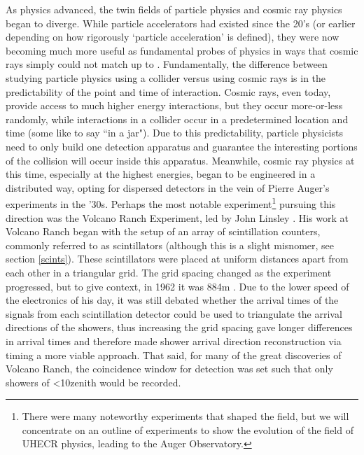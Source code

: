 As physics advanced, the twin fields of particle physics and cosmic ray physics began to diverge. While particle accelerators had existed since the 20's (or earlier depending on how rigorously `particle acceleration' is defined), they were now becoming much more useful as fundamental probes of physics in ways that cosmic rays simply could not match up to \cite{colliderhistory1}. Fundamentally, the difference between studying particle physics using a collider versus using cosmic rays is in the predictability of the point and time of interaction. Cosmic rays, even today, provide access to much higher energy interactions, but they occur more-or-less randomly, while interactions in a collider occur in a predetermined location and time (some like to say ``in a jar"). Due to this predictability, particle physicists need to only build one detection apparatus and guarantee the interesting portions of the collision will occur inside this apparatus. Meanwhile, cosmic ray physics at this time, especially at the highest energies, began to be engineered in a distributed way, opting for dispersed detectors in the vein of Pierre Auger's experiments in the '30s. 
Perhaps the most notable experiment\footnote{There were many noteworthy experiments that shaped the field, but we will concentrate on an outline of experiments to show the evolution of the field of UHECR physics, leading to the Auger Observatory.} pursuing this direction was the Volcano Ranch Experiment, led by John Linsley \cite{linsley}. His work at Volcano Ranch began with the setup of an array of scintillation counters, commonly referred to as scintillators (although this is a slight misnomer, see section \ref{scints}). These scintillators were placed at uniform distances apart from each other in a triangular grid. The grid spacing changed as the experiment progressed, but to give context, in 1962 it was 884m \cite{volranch}. Due to the lower speed of the electronics of his day, it was still debated whether the arrival times of the signals from each scintillation detector could be used to triangulate the arrival directions of the showers, thus increasing the grid spacing gave longer differences in arrival times and therefore made shower arrival direction reconstruction via timing a more viable approach. That said, for many of the great discoveries of Volcano Ranch, the coincidence window for detection was set such that only showers of \textless10\degree zenith would be recorded. 

